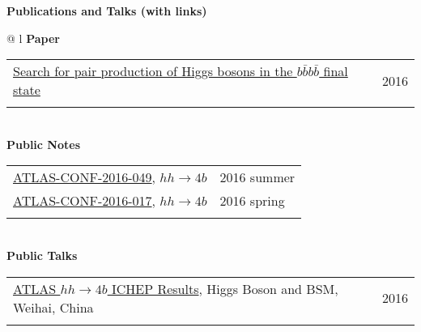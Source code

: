 \documentclass[letterpaper,11pt,oneside]{article}
\newcommand{\blue}[1]{\textcolor[rgb]{0,0,0.9}{#1}}
\begin{document}
\raggedright
 \textbf{\Large{Publications and Talks (with links)}} \\
\vspace{-0.5cm}
\normalsize
\begin{flushleft}
\hspace{1cm}
 \begin{tabular}{@{} l}
    \textbf{Paper} \\ 
    \begin{tabular}{@{} l l }
    \blue{\href{http://arxiv.org/abs/1606.04782}{Search for pair production of Higgs bosons in the $b\bar{b}b\bar{b}$ final state}} & 2016 \\
    \hspace{0.8\linewidth} & \hspace{0.1\linewidth} \\
     \end{tabular}
     \\
    \textbf{Public Notes} \\ 
    \begin{tabular}{@{} l l }
    \blue{\href{https://atlas.web.cern.ch/Atlas/GROUPS/PHYSICS/CONFNOTES/ATLAS-CONF-2016-049/}{ATLAS-CONF-2016-049}}, $hh\to4b$ & 2016 summer\\
    \blue{\href{https://atlas.web.cern.ch/Atlas/GROUPS/PHYSICS/CONFNOTES/ATLAS-CONF-2016-017/}{ATLAS-CONF-2016-017}}, $hh\to4b$ & 2016 spring\\
    \hspace{0.8\linewidth} & \hspace{0.1\linewidth} \\
     \end{tabular}
     \\
     \textbf{Public Talks} \\
     \begin{tabular}{@{} l l }
     \blue{\href{http://indico.ihep.ac.cn/event/5635/session/86/contribution/40}{ATLAS $hh\to4b$ ICHEP Results}}, Higgs Boson and BSM, Weihai, China & 2016\\
    \hspace{0.8\linewidth} & \hspace{0.1\linewidth} \\
      \end{tabular}
     \\

\end{tabular}
\end{flushleft}
\end{document}

